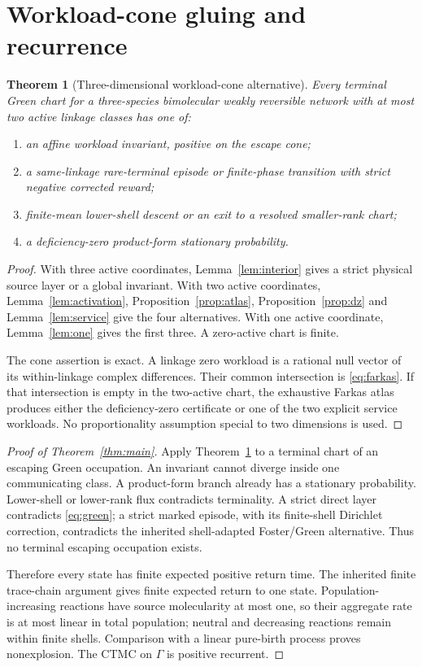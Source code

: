 \documentclass[11pt]{article}
\newtheorem{theorem}{Theorem}[section]
\theoremstyle{definition}\newtheorem{definition}[theorem]{Definition}
\theoremstyle{remark}\newtheorem{remark}[theorem]{Remark}
\begin{document}
\section{Workload-cone gluing and recurrence}

\begin{theorem}[Three-dimensional workload-cone alternative]\label{thm:cone}
Every terminal Green chart for a three-species bimolecular weakly reversible network with at most two active linkage classes has one of:
\begin{enumerate}
\item an affine workload invariant, positive on the escape cone;
\item a same-linkage rare-terminal episode or finite-phase transition with strict negative corrected reward;
\item finite-mean lower-shell descent or an exit to a resolved smaller-rank chart;
\item a deficiency-zero product-form stationary probability.
\end{enumerate}
\end{theorem}

\begin{proof}
With three active coordinates, Lemma~\ref{lem:interior} gives a strict physical source layer or a global invariant.  With two active coordinates, Lemma~\ref{lem:activation}, Proposition~\ref{prop:atlas}, Proposition~\ref{prop:dz} and Lemma~\ref{lem:service} give the four alternatives.  With one active coordinate, Lemma~\ref{lem:one} gives the first three.  A zero-active chart is finite.

The cone assertion is exact.  A linkage zero workload is a rational null vector of its within-linkage complex differences.  Their common intersection is \eqref{eq:farkas}.  If that intersection is empty in the two-active chart, the exhaustive Farkas atlas produces either the deficiency-zero certificate or one of the two explicit service workloads.  No proportionality assumption special to two dimensions is used.
\end{proof}

\begin{proof}[Proof of Theorem~\ref{thm:main}]
Apply Theorem~\ref{thm:cone} to a terminal chart of an escaping Green occupation.  An invariant cannot diverge inside one communicating class.  A product-form branch already has a stationary probability.  Lower-shell or lower-rank flux contradicts terminality.  A strict direct layer contradicts \eqref{eq:green}; a strict marked episode, with its finite-shell Dirichlet correction, contradicts the inherited shell-adapted Foster/Green alternative.  Thus no terminal escaping occupation exists.

Therefore every state has finite expected positive return time.  The inherited finite trace-chain argument gives finite expected return to one state.  Population-increasing reactions have source molecularity at most one, so their aggregate rate is at most linear in total population; neutral and decreasing reactions remain within finite shells.  Comparison with a linear pure-birth process proves nonexplosion.  The CTMC on $\Gamma$ is positive recurrent.
\end{proof}
\end{document}
